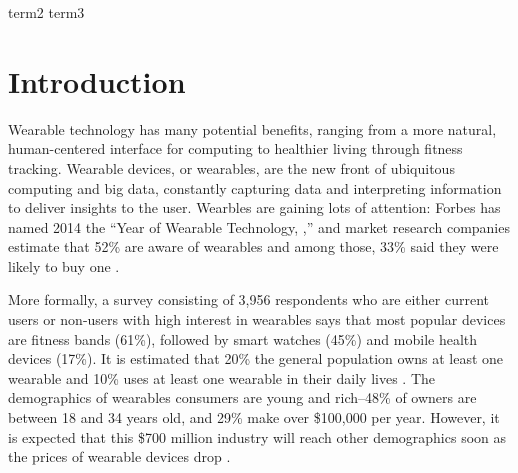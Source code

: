 \documentclass{acm_proc_article-sp}
\begin{document}
 {term2} {term3}






\section{Introduction}
Wearable technology has many potential benefits, ranging from a more natural, human-centered interface for computing to healthier living through fitness tracking. Wearable devices, or wearables, are the new front of ubiquitous computing and big data, constantly capturing data and interpreting information to deliver insights to the user. Wearbles are gaining lots of attention: Forbes has named 2014 the ``Year of Wearable Technology, \cite{Forbes},'' and market research companies estimate that 52\% are aware of wearables and among those, 33\% said they were likely to buy one \cite{NPD}. 

More formally, a survey consisting of 3,956 respondents who are either current users or non-users with high interest in wearables says that most popular devices are fitness bands (61\%), followed by smart watches (45\%) and mobile health devices (17\%)\cite{Nilsen}. It is estimated that 20\% the general population owns at least one wearable and 10\% uses at least one wearable in their daily lives \cite{WearableStatNews}. The demographics of wearables consumers are young and rich--48\% of owners are between 18 and 34 years old, and 29\% make over \$100,000 per year. However, it is expected that this \$700 million industry will reach other demographics soon as the prices of wearable devices drop \cite{cmo}. 
\end{document}
